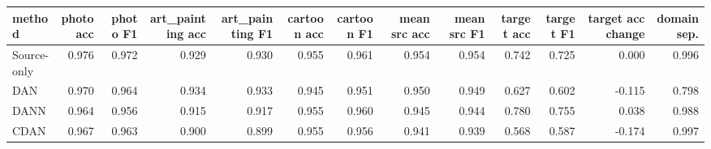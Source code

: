 \begin{tabular}{lrrrrrrrrrrrr}
\toprule
method & photo acc & photo F1 & art\_painting acc & art\_painting F1 & cartoon acc & cartoon F1 & mean src acc & mean src F1 & target acc & target F1 & target acc change & domain sep. \\
\midrule
Source-only & 0.976 & 0.972 & 0.929 & 0.930 & 0.955 & 0.961 & 0.954 & 0.954 & 0.742 & 0.725 & 0.000 & 0.996 \\
DAN & 0.970 & 0.964 & 0.934 & 0.933 & 0.945 & 0.951 & 0.950 & 0.949 & 0.627 & 0.602 & -0.115 & 0.798 \\
DANN & 0.964 & 0.956 & 0.915 & 0.917 & 0.955 & 0.960 & 0.945 & 0.944 & 0.780 & 0.755 & 0.038 & 0.988 \\
CDAN & 0.967 & 0.963 & 0.900 & 0.899 & 0.955 & 0.956 & 0.941 & 0.939 & 0.568 & 0.587 & -0.174 & 0.997 \\
\bottomrule
\end{tabular}
